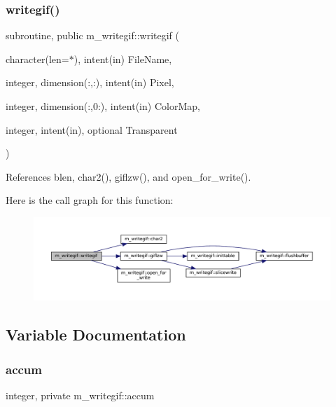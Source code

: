 \subsubsection{\texorpdfstring{writegif()}{writegif()}}
{\footnotesize\ttfamily subroutine, public m\+\_\+writegif\+::writegif (\begin{DoxyParamCaption}\item[{character(len=$\ast$), intent(in)}]{File\+Name,  }\item[{integer, dimension(\+:,\+:), intent(in)}]{Pixel,  }\item[{integer, dimension(\+:,0\+:), intent(in)}]{Color\+Map,  }\item[{integer, intent(in), optional}]{Transparent }\end{DoxyParamCaption})}



References blen, char2(), giflzw(), and open\+\_\+for\+\_\+write().

Here is the call graph for this function\+:
\nopagebreak
\begin{figure}[H]
\begin{center}
\leavevmode
\includegraphics[width=350pt]{namespacem__writegif_a02be37849028b2f9484cff1b4285375d_cgraph}
\end{center}
\end{figure}


\subsection{Variable Documentation}
\mbox{\label{namespacem__writegif_a2a80a14e30c6ed2b0003d46a93480531}} 
\subsubsection{\texorpdfstring{accum}{accum}}
{\footnotesize\ttfamily integer, private m\+\_\+writegif\+::accum\hspace{0.3cm}{\ttfamily [private]}}

